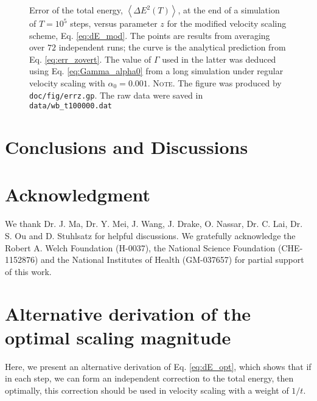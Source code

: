 \documentclass[reprint]{revtex4-1}
\newcommand{\red}[1]{{\color{red} #1}}
\newcommand{\note}[1]{{\color{DarkGreen}\footnotesize \textsc{Note.} #1}}
\begin{document}
\begin{figure}[h]
\begin{center}
  \caption{
    \label{fig:errz}
    Error of the total energy,
    $\left\langle \Delta E^2(T) \right\rangle$,
    at the end of a simulation of $T = 10^5$ steps,
    versus parameter $z$
    for the modified velocity scaling scheme,
    Eq. \eqref{eq:dE_mod}.
    The points are results from averaging over \red{$72$} independent runs;
    the curve is the analytical prediction from
    Eq. \eqref{eq:err_zovert}.
    The value of $\Gamma$ used in the latter was deduced
    using Eq. \eqref{eq:Gamma_alpha0} from
    a long simulation under regular velocity scaling
    with $\alpha_0 = 0.001$.
    \note{The figure was produced by \texttt{doc/fig/errz.gp}.
      The raw data were saved in \texttt{data/wb\_t100000.dat}
    }%
  }
\end{center}
\end{figure}




\section{\label{sec:conclusion}
Conclusions and Discussions}



\section{Acknowledgment}

We thank Dr. J. Ma, Dr. Y. Mei, J. Wang,
J. Drake, O. Nassar, Dr. C. Lai, Dr. S. Ou and D. Stuhlsatz
for helpful discussions.
We gratefully acknowledge the Robert A. Welch Foundation (H-0037),
the National Science Foundation (CHE-1152876)
and
the National Institutes of Health (GM-037657) for partial support of this work.
%


\appendix


\section{\label{sec:error}
  Alternative derivation of
  the optimal scaling magnitude
}


Here, we present an alternative derivation of Eq. \eqref{eq:dE_opt},
which shows that if in each step, we can form an independent correction
to the total energy,
then optimally,
this correction should be used
in velocity scaling with a weight of $1/t$.
\end{document}
